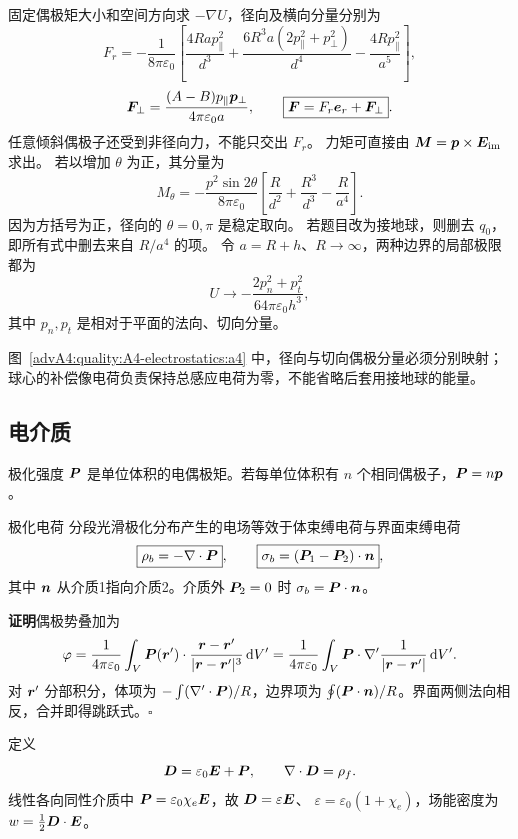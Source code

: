 \begin{advsolution}
固定偶极矩大小和空间方向求 $-\nabla U$，径向及横向分量分别为
\[
 F_r=-\frac1{8\pi\varepsilon_0}
 \left[\frac{4Ra p_\parallel^2}{d^3}
 +\frac{6R^3a(2p_\parallel^2+p_\perp^2)}{d^4}
 -\frac{4R p_\parallel^2}{a^5}\right],
\]
\[
 \bm{F}_\perp=\frac{(A-B)p_\parallel\bm{p}_\perp}
 {4\pi\varepsilon_0a},\qquad
 \boxed{\bm{F}=F_r\bm{e}_r+\bm{F}_\perp}.
\]
任意倾斜偶极子还受到非径向力，不能只交出 $F_r$。
力矩可直接由 $\bm{M}=\bm{p}\times\bm{E}_{\rm im}$ 求出。
若以增加 $\theta$ 为正，其分量为
\[
 \boxed{M_\theta=-\frac{p^2\sin2\theta}{8\pi\varepsilon_0}
 \left[\frac R{d^2}+\frac{R^3}{d^3}-\frac R{a^4}\right]}.
\]
因为方括号为正，径向的 $\theta=0,\pi$ 是稳定取向。
若题目改为接地球，则删去 $q_0$，即所有式中删去来自 $R/a^4$ 的项。
令 $a=R+h$、$R\to\infty$，两种边界的局部极限都为
\[
 U\longrightarrow-\frac{2p_n^2+p_t^2}{64\pi\varepsilon_0h^3},
\]
其中 $p_n,p_t$ 是相对于平面的法向、切向分量。

图~\ref{advA4:quality:A4-electrostatics:a4} 中，径向与切向偶极分量必须分别映射；球心的补偿像电荷负责保持总感应电荷为零，不能省略后套用接地球的能量。
\end{advsolution}

\subsection{电介质}

极化强度 $\bm{P}$ 是单位体积的电偶极矩。若每单位体积有 $n$ 个相同偶极子，$\bm{P}=n\bm{p}$。

\begin{advtheorem}{极化电荷}\label{advA4:thm:polarization-charge}
分段光滑极化分布产生的电场等效于体束缚电荷与界面束缚电荷
\[
 \boxed{\rho_b=-\nabla\cdot\bm{P}},
 \qquad
 \boxed{\sigma_b=(\bm{P}_1-\bm{P}_2)\cdot\bm{n}},
\]
其中 $\bm{n}$ 从介质1指向介质2。介质外 $\bm{P}_2=0$ 时
$\sigma_b=\bm{P}\cdot\bm{n}$。
\end{advtheorem}
\noindent\textbf{证明}\quad 偶极势叠加为
\[
 \varphi=\frac1{4\pi\varepsilon_0}
 \int_V\bm{P}(\bm{r}')\cdot
 \frac{\bm{r}-\bm{r}'}{|\bm{r}-\bm{r}'|^3}\mathop{}\!\mathrm d V'
 =\frac1{4\pi\varepsilon_0}\int_V
 \bm{P}\cdot\nabla'\frac1{|\bm{r}-\bm{r}'|}\mathop{}\!\mathrm d V'.
\]
对 $\bm{r}'$ 分部积分，体项为
$-\int(\nabla'\cdot\bm{P})/R$，边界项为
$\oint(\bm{P}\cdot\bm{n})/R$。界面两侧法向相反，合并即得跳跃式。\hfill$\square$

定义
\[
 \bm{D}=\varepsilon_0\bm{E}+\bm{P},
 \qquad \nabla\cdot\bm{D}=\rho_f.
\]
线性各向同性介质中
$\bm{P}=\varepsilon_0\chi_e\bm{E}$，故
$\bm{D}=\varepsilon\bm{E}$、
$\varepsilon=\varepsilon_0(1+\chi_e)$，场能密度为
$w=\tfrac12\bm{D}\cdot\bm{E}$。

